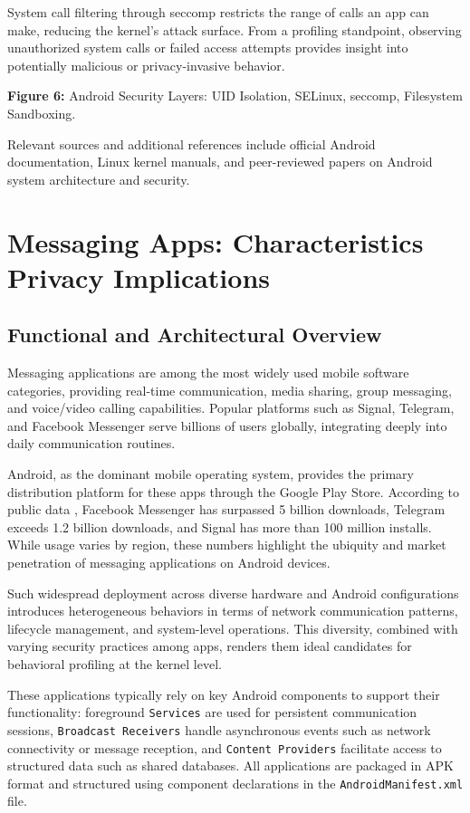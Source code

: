 \documentclass[a4paper,12pt]{report}
\begin{document}
System call filtering through seccomp restricts the range of calls an app can make, reducing the kernel's attack surface. From a profiling standpoint, observing unauthorized system calls or failed access attempts provides insight into potentially malicious or privacy-invasive behavior.

\textbf{Figure 6:} Android Security Layers: UID Isolation, SELinux, seccomp, Filesystem Sandboxing.

Relevant sources and additional references include official Android documentation, Linux kernel manuals, and peer-reviewed papers on Android system architecture and security.
\section{Messaging Apps: Characteristics  Privacy Implications}

\subsection{Functional and Architectural Overview}
Messaging applications are among the most widely used mobile software categories, providing real-time communication, media sharing, group messaging, and voice/video calling capabilities. Popular platforms such as Signal, Telegram, and Facebook Messenger serve billions of users globally, integrating deeply into daily communication routines.

Android, as the dominant mobile operating system, provides the primary distribution platform for these apps through the Google Play Store. According to public data \cite{statista2024messaging, googleplaydata2024}, Facebook Messenger has surpassed 5 billion downloads, Telegram exceeds 1.2 billion downloads, and Signal has more than 100 million installs. While usage varies by region, these numbers highlight the ubiquity and market penetration of messaging applications on Android devices.

Such widespread deployment across diverse hardware and Android configurations introduces heterogeneous behaviors in terms of network communication patterns, lifecycle management, and system-level operations. This diversity, combined with varying security practices among apps, renders them ideal candidates for behavioral profiling at the kernel level.

These applications typically rely on key Android components to support their functionality: foreground \texttt{Services} are used for persistent communication sessions, \texttt{Broadcast Receivers} handle asynchronous events such as network connectivity or message reception, and \texttt{Content Providers} facilitate access to structured data such as shared databases. All applications are packaged in APK format and structured using component declarations in the \texttt{AndroidManifest.xml} file.
\end{document}
